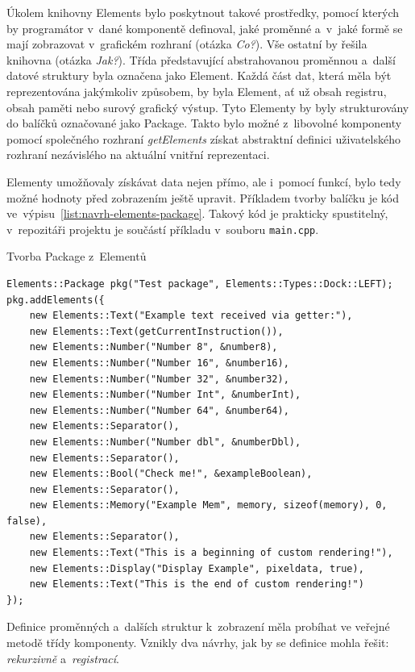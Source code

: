 Úkolem knihovny Elements bylo poskytnout takové prostředky, pomocí kterých by programátor v~dané komponentě definoval, jaké proměnné a~v~jaké formě se mají zobrazovat v~grafickém rozhraní (otázka \emph{Co?}). Vše ostatní by řešila knihovna (otázka \emph{Jak?}). Třída představující abstrahovanou proměnnou a~další datové struktury byla označena jako Element. Každá část dat, která měla být reprezentována jakýmkoliv způsobem, by byla Element, ať už obsah registru, obsah paměti nebo surový grafický výstup. Tyto Elementy by byly strukturovány do balíčků označované jako Package. Takto bylo možné z~libovolné komponenty pomocí společného rozhraní \emph{getElements} získat abstraktní definici uživatelského rozhraní nezávislého na aktuální vnitřní reprezentaci.

Elementy umožňovaly získávat data nejen přímo, ale i~pomocí funkcí, bylo tedy možné hodnoty před zobrazením ještě upravit. Příkladem tvorby balíčku je kód ve~výpisu~\ref{list:navrh-elements-package}. Takový kód je prakticky spustitelný, v~repozitáři projektu je součástí příkladu v~souboru \texttt{main.cpp}.

\begin{listing}
	\caption{Tvorba Package z~Elementů}
	\label{list:navrh-elements-package}
	\begin{verbatim}
Elements::Package pkg("Test package", Elements::Types::Dock::LEFT);
pkg.addElements({
	new Elements::Text("Example text received via getter:"),
	new Elements::Text(getCurrentInstruction()),
	new Elements::Number("Number 8", &number8),
	new Elements::Number("Number 16", &number16),
	new Elements::Number("Number 32", &number32),
	new Elements::Number("Number Int", &numberInt),
	new Elements::Number("Number 64", &number64),
	new Elements::Separator(),
	new Elements::Number("Number dbl", &numberDbl),
	new Elements::Separator(),
	new Elements::Bool("Check me!", &exampleBoolean),
	new Elements::Separator(),
	new Elements::Memory("Example Mem", memory, sizeof(memory), 0, false),
	new Elements::Separator(),
	new Elements::Text("This is a beginning of custom rendering!"),
	new Elements::Display("Display Example", pixeldata, true),
	new Elements::Text("This is the end of custom rendering!")
});
	\end{verbatim}
\end{listing}

Definice proměnných a~dalších struktur k~zobrazení měla probíhat ve veřejné metodě třídy komponenty. Vznikly dva návrhy, jak by se definice mohla řešit: \emph{rekurzivně} a~\emph{registrací}.

